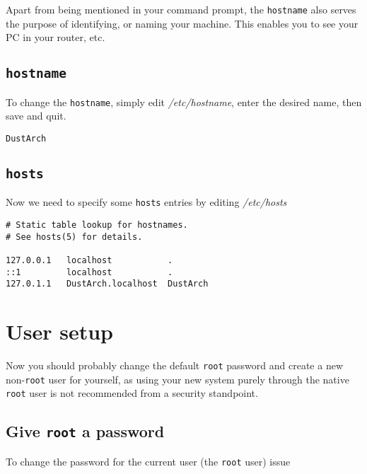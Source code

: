 \documentclass[9pt]{report}
\begin{document}
Apart from being mentioned in your command prompt, the \texttt{hostname} also serves the purpose of identifying, or naming your machine.
This enables you to see your PC in your router, etc.



\newpage

\hypertarget{x-hostname}{\subsection{\texttt{hostname}}}
To change the \texttt{hostname}, simply edit \textit{/etc/hostname}, enter the desired name, then save and quit.


\begin{verbatim}
DustArch
\end{verbatim}


\newpage

\hypertarget{x-hosts}{\subsection{\texttt{hosts}}}
Now we need to specify some \texttt{hosts} entries by editing \textit{/etc/hosts}


\begin{verbatim}
# Static table lookup for hostnames.
# See hosts(5) for details.

127.0.0.1   localhost           .
::1         localhost           .
127.0.1.1   DustArch.localhost  DustArch
\end{verbatim}


\newpage

\hypertarget{x-user-setup}{\section{User setup}}
Now you should probably change the default \texttt{root} password and create a new non-\texttt{root} user for yourself, as using your new system purely through the native \texttt{root} user is not recommended from a security standpoint.



\newpage

\hypertarget{x-give-root-a-password}{\subsection{Give \texttt{root} a password}}
To change the password for the current user (the \texttt{root} user) issue
\end{document}
